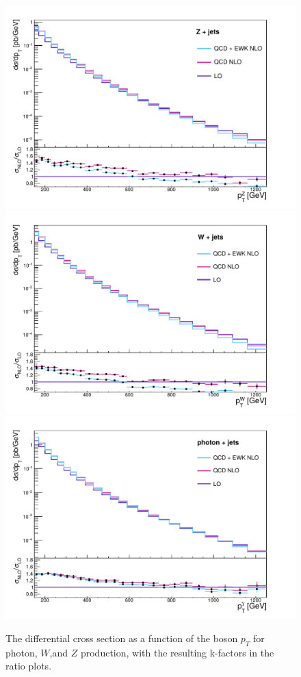 \begin{figure}[ht]
  \centering
 \includegraphics[width=.49\textwidth]{Z_EWK_kfactor.pdf} 
 \includegraphics[width=.49\textwidth]{W_EWK_kfactor.pdf} \\
 \includegraphics[width=.49\textwidth]{gamma_EWK_kfactor.pdf} 
 \caption{The differential cross section as a function of the boson $p_T$ for photon, $W$,and $Z$ production, with the resulting k-factors in the ratio plots.}
 \label{fig:kfactors}
\end{figure}

